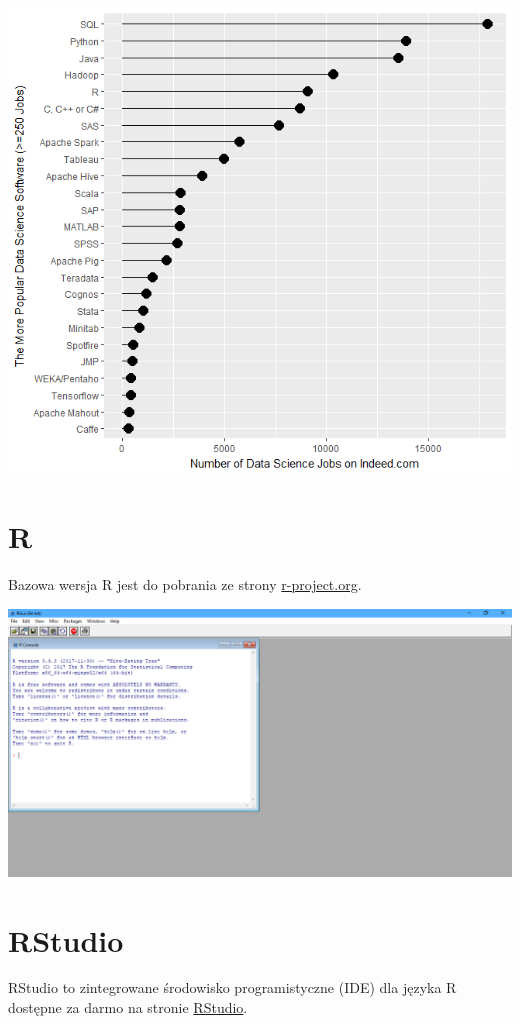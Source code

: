 \documentclass[
]{book}
\begin{document}
\includegraphics{img/pop_r1.png}

\hypertarget{r}{%
\section{R}\label{r}}

Bazowa wersja R jest do pobrania ze strony \href{https://cloud.r-project.org/}{r-project.org}.

\includegraphics{img/r.png}

\hypertarget{rstudio}{%
\section{RStudio}\label{rstudio}}

RStudio to zintegrowane środowisko programistyczne (IDE) dla języka R dostępne za darmo na stronie \href{https://www.rstudio.com/products/rstudio/download/}{RStudio}.
\end{document}
